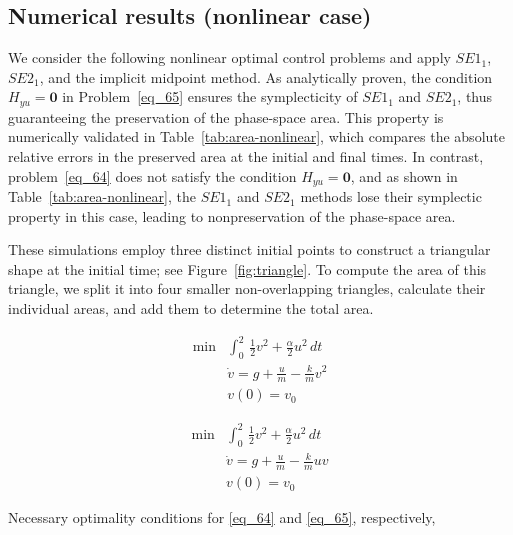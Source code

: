 \documentclass[a4paper, 10pt]{article}
\newcommand{\SEoo}{SE1_1}
\newcommand{\SEto}{SE2_1}
\begin{document}
\subsection{Numerical results (nonlinear case)}
\label{subsec:numerical-results-nonlinear}
We consider the following nonlinear optimal control problems and apply $\SEoo$, $\SEto$, and the implicit midpoint method. As analytically proven, the condition $H_{yu} = \bm{0}$ in Problem~\eqref{eq_65} ensures the symplecticity of $\SEoo$ and $\SEto$, thus guaranteeing the preservation of the phase-space area. This property is numerically validated in Table~\ref{tab:area-nonlinear}, which compares the absolute relative errors in the preserved area at the initial and final times. In contrast, problem~\eqref{eq_64} does not satisfy the condition $H_{yu} = \bm{0}$, and as shown in Table~\ref{tab:area-nonlinear}, the $\SEoo$ and $\SEto$ methods lose their symplectic property in this case, leading to nonpreservation of the phase-space area.

These simulations employ three distinct initial points to construct a triangular shape at the initial time; see Figure~\ref{fig:triangle}. To compute the area of this triangle, we split it into four smaller non-overlapping triangles, calculate their individual areas, and add them to determine the total area.

\begin{minipage}{0.45\textwidth}
\begin{align}
     \min & \int_{0}^2\, \tfrac{1}{2}v^{2} + \tfrac{\alpha}{2}u^2\, dt \nonumber \\
     & \dot{v} = g + \tfrac{u}{m} - \tfrac{k}{m}v^2 \label{eq_64} \\
     & v(0) = v_0 \nonumber
\end{align}
\end{minipage}
\hfill
\begin{minipage}{0.45\textwidth}
\begin{align}
\min & \int_{0}^2 \, \tfrac{1}{2}v^{2}+ \tfrac{\alpha}{2}u^2\, dt \nonumber \\
& \dot{v} = g + \tfrac{u}{m} - \tfrac{k}{m}uv \label{eq_65} \\
& v(0) = v_0 \nonumber
\end{align}
\end{minipage}

Necessary optimality conditions for \eqref{eq_64} and \eqref{eq_65}, respectively,
\end{document}
